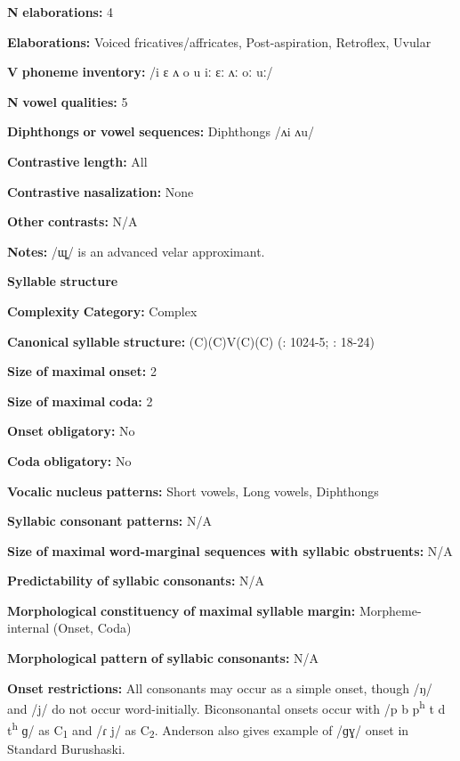 \textbf{N} \textbf{elaborations:} 4

\textbf{Elaborations:} Voiced fricatives/affricates, Post-aspiration, Retroflex, Uvular

\textbf{V} \textbf{phoneme} \textbf{inventory:} /i ɛ ʌ o u iː ɛː ʌː oː uː/

\textbf{N} \textbf{vowel} \textbf{qualities:} 5

\textbf{Diphthongs} \textbf{or} \textbf{vowel} \textbf{sequences:} Diphthongs /ʌi ʌu/

\textbf{Contrastive} \textbf{length:} All

\textbf{Contrastive} \textbf{nasalization:} None

\textbf{Other} \textbf{contrasts:} N/A

\textbf{Notes:} /ɰ̟/ is an advanced velar approximant.

\textbf{Syllable} \textbf{structure}

\textbf{Complexity} \textbf{Category:} Complex

\textbf{Canonical} \textbf{syllable} \textbf{structure:} (C)(C)V(C)(C) (\citealt{Anderson1997}: 1024-5; \citealt{Yoshioka2012}: 18-24)

\textbf{Size} \textbf{of} \textbf{maximal} \textbf{onset:} 2

\textbf{Size} \textbf{of} \textbf{maximal} \textbf{coda:} 2

\textbf{Onset} \textbf{obligatory:} No

\textbf{Coda} \textbf{obligatory:} No

\textbf{Vocalic} \textbf{nucleus} \textbf{patterns:} Short vowels, Long vowels, Diphthongs

\textbf{Syllabic} \textbf{consonant} \textbf{patterns:} N/A

\textbf{Size} \textbf{of} \textbf{maximal} \textbf{word{}-marginal sequences with syllabic obstruents:} N/A

\textbf{Predictability} \textbf{of} \textbf{syllabic} \textbf{consonants:} N/A

\textbf{Morphological} \textbf{constituency} \textbf{of} \textbf{maximal} \textbf{syllable} \textbf{margin:} Morpheme-internal (Onset, Coda)

\textbf{Morphological} \textbf{pattern} \textbf{of} \textbf{syllabic} \textbf{consonants:} N/A

\textbf{Onset} \textbf{restrictions:} All consonants may occur as a simple onset, though /ŋ/ and /j/ do not occur word-initially. Biconsonantal onsets occur with /p b p\textsuperscript{h} t d t\textsuperscript{h} ɡ/ as C\textsubscript{1} and /ɾ j/ as C\textsubscript{2}. Anderson also gives example of /ɡɣ/ onset in Standard Burushaski.

